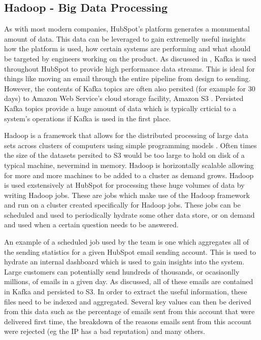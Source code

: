 


\subsection{Hadoop - Big Data Processing}
 As with most modern companies, HubSpot's platform generates a monumental amount of data. This data can be leveraged to gain extremelly useful insights how the platform is used, how certain systems are performing and what should be targeted by engineers working on the product. As discussed in , Kafka is used throughout HubSpot to provide high performance data streams. This is ideal for things like moving an email through the entire pipeline from design to sending. However, the contents of Kafka topics are often also persited (for example for 30 days) to Amazon Web Service's cloud storage facility, Amazon S3 \cite{s3} . Persisted Kafka topics provide a huge amount of data which is typically crticial to a system's operations if Kafka is used in the first place. 
 
 Hadoop is a framework that allows for the distributed processing of large data sets across clusters of computers using simple programming models \cite{hadoop}. Often times the size of the datasets persited to S3 would be too large to hold on disk of a typical machine, nevermind in memory. Hadoop is horizontally scalable allowing for more and more machines to be added to a cluster as demand grows. Hadoop is used exstensively at HubSpot for processing these huge volumes of data by writing Hadoop jobs. These are jobs which make use of the Hadoop framework and run on a cluster created specifically for Hadoop jobs. These jobs can be scheduled and used to periodically hydrate some other data store, or on demand and used when a certain question needs to be answered. 
 
 An example of a scheduled job used by the \team{} team is one which aggregates all of the sending statistics for a given HubSpot email sending account. This is used to hydrate an internal dashboard which is used to gain insights into the system. Large customers can potentially send hundreds of thousands, or ocasiaonlly millions, of emails in a given day. As discussed, all of these emails are contained in Kafka and persisted to S3. In order to extract the useful information, these files need to be indexed and aggregated. Several key values can then be derived from this data such as the percentage of emails sent from this account that were delivered first time, the breakdown of the reasons emails sent from this account were rejected (eg the IP has a bad reputation) and many others.

